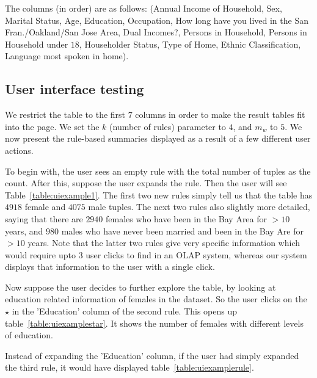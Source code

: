 \documentclass{sig-alternate}
\begin{document}
The columns (in order) are as follows:
(Annual Income of Household, Sex, Marital Status, Age, Education, Occupation, How long have you lived in the San Fran./Oakland/San Jose Area, Dual Incomes?, Persons in Household, Persons in Household under $18$, Householder Status, Type of Home, Ethnic Classification, Language most spoken in home).

\subsection{User interface testing}
We restrict the table to the first $7$ columns in order to make the result tables fit into the page. We set the $k$ (number of rules) parameter to $4$, and $m_w$ to $5$. We now present the rule-based summaries displayed as a result of a few different user actions.

To begin with, the user sees an empty rule with the total number of tuples as the count. After this, suppose the user expands the rule. Then the user will see Table~\ref{table:uiexample1}. The first two new rules simply tell us that the table has $4918$ female and $4075$ male tuples. The next two rules also slightly more detailed, saying that there are $2940$ females who have been in the Bay Area for $> 10$ years, and $980$ males who have never been married and been in the Bay Are for $> 10$ years. Note that the latter two rules give very specific information which would require upto $3$ user clicks to find in an OLAP system, whereas our system displays that information to the user with a single click. 

Now suppose the user decides to further explore the table, by looking at education related information of females in the dataset. So the user clicks on the $\star$ in the 'Education' column of the second rule. This opens up table~\ref{table:uiexamplestar}. It shows the number of females with different levels of education.

Instead of expanding the 'Education' column, if the user had simply expanded the third rule, it would have displayed table~\ref{table:uiexamplerule}. 
\end{document}
